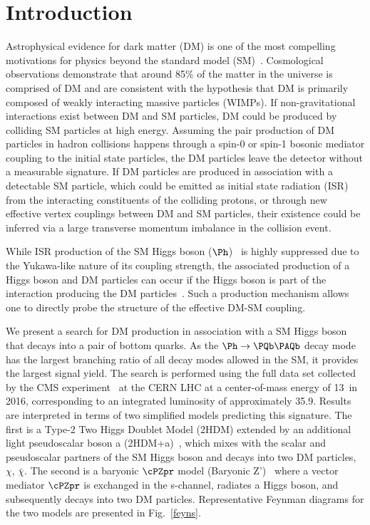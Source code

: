\section{Introduction} \label{intro}

Astrophysical evidence for dark matter (DM) is one of the most compelling motivations for
physics beyond the standard model
(SM)~\cite{dm1,dm2,dm3}. Cosmological observations demonstrate that
around 85\% of the matter in the universe is comprised of DM
\cite{planck} and are consistent with the hypothesis that DM is primarily composed of
weakly interacting massive particles (WIMPs). If non-gravitational
interactions exist between DM and SM particles, DM could be produced
by colliding SM particles at high energy. Assuming the pair
production of DM particles in hadron collisions happens through a
spin-0 or spin-1 bosonic mediator coupling to the initial state particles, the DM particles leave the
detector without a measurable signature. If DM particles are produced in association with a detectable SM particle, which could be emitted
as initial state radiation (ISR) from the interacting constituents of the colliding protons, or through
new effective vertex couplings between DM and SM particles, their
existence could be inferred via a large transverse momentum imbalance in the collision event. 


While ISR production of the SM Higgs boson ($\Ph$)~\cite{HiggsObs_ATLAS, HiggsObs_CMS, HiggsObs_CMS_Long} is highly suppressed due to the Yukawa-like nature of its coupling strength, 
the associated production of a Higgs boson and DM particles
can occur if the
Higgs boson is part of the interaction producing the DM particles~\cite{monoHiggs3,2HDM,PhysRevD.89.075017}.
Such a production mechanism allows one to directly probe the structure of the effective DM-SM coupling.

We  present a search for DM production in association
with a SM Higgs boson that decays into a pair of bottom quarks. As the 
$\Ph\rightarrow \bb$ decay mode has the largest branching ratio of all decay modes allowed in the SM, it provides the largest signal yield. The search is performed using the full data set collected by the CMS experiment~\cite{CMSdetector} at the CERN LHC at a center-of-mass energy of 13\TeV~in 2016, corresponding to an integrated luminosity of approximately 35.9\fbinv. Results are interpreted in terms of two simplified models predicting this signature. The first is a Type-2 Two Higgs Doublet Model (2HDM) extended by an additional light pseudoscalar boson a (2HDM+a)~\cite{Bauer2017}, which mixes with the scalar and pseudoscalar partners of the SM Higgs boson and decays into two DM particles, $\chi$, $\bar{\chi}$. The second is a baryonic $\cPZpr$ model (Baryonic Z')~\cite{PhysRevD.89.075017} where a vector mediator $\cPZpr$ is exchanged in the s-channel, radiates a Higgs boson, and subsequently decays into two DM 
particles. Representative Feynman diagrams for the two models are presented in Fig.~\ref{feyns}.


